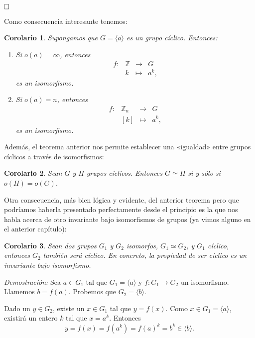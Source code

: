 \documentclass[12pt]{article}
\newtheorem{corolario}{Corolario}[theorem]
\begin{document}
$\hfill \square$

Como consecuencia interesante tenemos:

\begin{corolario}
Supongamos que $G = \langle a \rangle$ es un grupo cíclico. Entonces:
\begin{enumerate}
\item Si $o(a) = \infty$, entonces $$\begin{array}{rccl}
f\colon &\mathbb{Z}& \longrightarrow &G\\
&k& \longmapsto &a^{k},
\end{array}
$$ es un isomorfismo.
\item Si $o(a)= n$, entonces $$\begin{array}{rccl}
f\colon &\mathbb{Z}_{n}& \longrightarrow &G\\
&\left[ k \right]& \longmapsto &a^{k},
\end{array}
$$ es un isomorfismo.
\end{enumerate} 
\end{corolario}

Además, el teorema anterior nos permite establecer una «igualdad» entre grupos cíclicos a través de isomorfismos:

\begin{corolario} Sean $G$ y $H$ grupos cíclicos. Entonces $G \simeq H$ si y sólo si $o(H) = o(G)$.
\end{corolario}

Otra consecuencia, más bien lógica y evidente, del anterior teorema pero que podríamos haberla presentado perfectamente desde el principio es la que nos habla acerca de otro invariante bajo isomorfismos de grupos (ya vimos alguno en el anterior capítulo):

\begin{corolario} Sean dos grupos $G_{1}$ y $G_{2}$ isomorfos, $G_{1} \simeq G_{2}$, y $G_{1}$ cíclico, entonces $G_{2}$ también será cíclico. En concreto, la propiedad de ser cíclico es un invariante bajo isomorfismo.
\end{corolario}
\emph{Demostración: }Sea $a \in G_{1}$ tal que $G_{1} = \langle a \rangle$ y $f\colon G_{1} \longrightarrow G_{2}$ un isomorfismo. Llamemos $b= f(a)$. Probemos que $G_{2} = \langle b \rangle$.

Dado un $y \in G_{2}$, existe un $x \in G_{1}$ tal que $y = f(x)$. Como $x \in G_{1} = \langle a \rangle$, existirá un entero $k$ tal que $x = a^{k}$. Entonces $$y = f(x) = f(a^{k})= f(a)^{k} = b^{k} \in \langle b \rangle.$$
\end{document}
